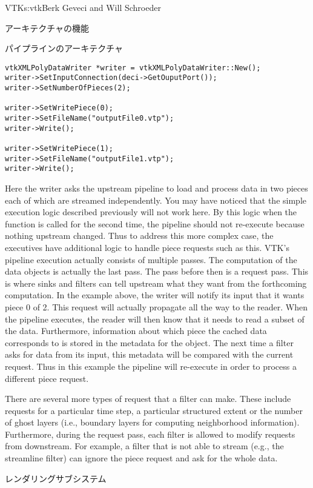 \begin{aosachapter}{VTK}{s:vtk}{Berk Geveci and Will Schroeder}
\begin{aosasect1}{アーキテクチャの機能}
\begin{aosasect2}{パイプラインのアーキテクチャ}
\begin{verbatim}
vtkXMLPolyDataWriter *writer = vtkXMLPolyDataWriter::New();
writer->SetInputConnection(deci->GetOuputPort());
writer->SetNumberOfPieces(2);

writer->SetWritePiece(0);
writer->SetFileName("outputFile0.vtp");
writer->Write();

writer->SetWritePiece(1);
writer->SetFileName("outputFile1.vtp");
writer->Write();
\end{verbatim}

Here the writer asks the upstream pipeline to load and process data in
two pieces each of which are streamed independently. You may have
noticed that the simple execution logic described previously will not
work here. By this logic when the  function is called for
the second time, the pipeline should not re-execute because nothing
upstream changed. Thus to address this more complex case, the
executives have additional logic to handle piece requests such as
this. VTK's pipeline execution actually consists of multiple
passes. The computation of the data objects is actually the last
pass. The pass before then is a request pass. This is where sinks and
filters can tell upstream what they want from the forthcoming
computation. In the example above, the writer will notify its input
that it wants piece 0 of 2. This request will actually propagate all
the way to the reader. When the pipeline executes, the reader will
then know that it needs to read a subset of the data. Furthermore,
information about which piece the cached data corresponds to is stored
in the metadata for the object. The next time a filter asks for data
from its input, this metadata will be compared with the current
request. Thus in this example the pipeline will re-execute in order to
process a different piece request.

There are several more types of request that a filter can make. These
include requests for a particular time step, a particular structured
extent or the number of ghost layers (i.e., boundary layers for
computing neighborhood information). Furthermore, during the request
pass, each filter is allowed to modify requests from downstream. For
example, a filter that is not able to stream (e.g., the streamline
filter) can ignore the piece request and ask for the whole data.

\end{aosasect2}

\begin{aosasect2}{レンダリングサブシステム}


\end{aosasect2}
\end{aosasect1}
\end{aosachapter}
